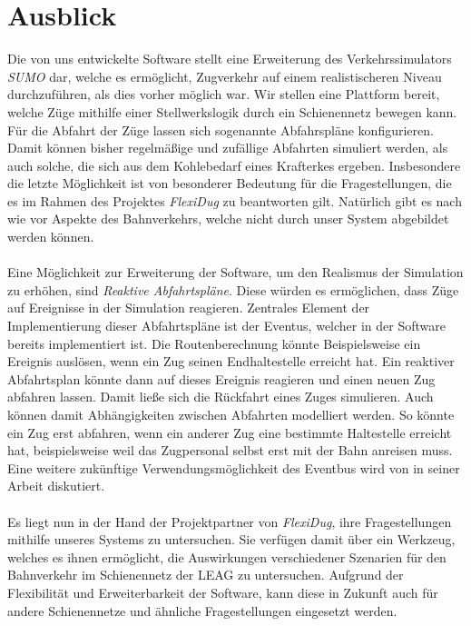 \section{Ausblick}

Die von uns entwickelte Software stellt eine Erweiterung des Verkehrssimulators \emph{SUMO} dar, welche es ermöglicht, Zugverkehr auf einem realistischeren Niveau durchzuführen, als dies vorher möglich war. Wir stellen eine Plattform bereit, welche Züge mithilfe einer Stellwerkslogik durch ein Schienennetz bewegen kann. Für die Abfahrt der Züge lassen sich sogenannte Abfahrspläne konfigurieren. Damit können bisher regelmäßige und zufällige Abfahrten simuliert werden, als auch solche, die sich aus dem Kohlebedarf eines Krafterkes ergeben. Insbesondere die letzte Möglichkeit ist von besonderer Bedeutung für die Fragestellungen, die es im Rahmen des Projektes \emph{FlexiDug} zu beantworten gilt. Natürlich gibt es nach wie vor Aspekte des Bahnverkehrs, welche nicht durch unser System abgebildet werden können.\\
\\
Eine Möglichkeit zur Erweiterung der Software, um den Realismus der Simulation zu erhöhen, sind \emph{Reaktive Abfahrtspläne}. Diese würden es ermöglichen, dass Züge auf Ereignisse in der Simulation reagieren. Zentrales Element der Implementierung dieser Abfahrtspläne ist der Eventus, welcher in der Software bereits implementiert ist. Die Routenberechnung könnte Beispielsweise ein Ereignis auslösen, wenn ein Zug seinen Endhaltestelle erreicht hat. Ein reaktiver Abfahrtsplan könnte dann auf dieses Ereignis reagieren und einen neuen Zug abfahren lassen. Damit ließe sich die Rückfahrt eines Zuges simulieren. Auch können damit Abhängigkeiten zwischen Abfahrten modelliert werden. So könnte ein Zug erst abfahren, wenn ein anderer Zug eine bestimmte Haltestelle erreicht hat, beispielsweise weil das Zugpersonal selbst erst mit der Bahn anreisen muss. Eine weitere zukünftige Verwendungsmöglichkeit des Eventbus wird von \citeauthor{persitzky_fehlerinjektion_2023} in seiner Arbeit\cite{persitzky_fehlerinjektion_2023} diskutiert.\\
\\
Es liegt nun in der Hand der Projektpartner von \emph{FlexiDug}, ihre Fragestellungen mithilfe unseres Systems zu untersuchen. Sie verfügen damit über ein Werkzeug, welches es ihnen ermöglicht, die Auswirkungen verschiedener Szenarien für den Bahnverkehr im Schienennetz der LEAG zu untersuchen. Aufgrund der Flexibilität und Erweiterbarkeit der Software, kann diese in Zukunft auch für andere Schienennetze und ähnliche Fragestellungen eingesetzt werden.
